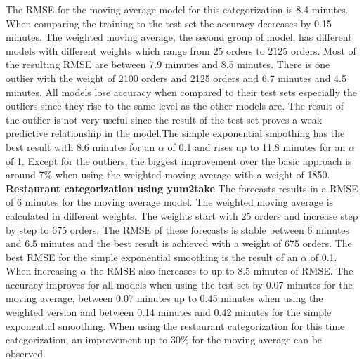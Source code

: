 The RMSE for the moving average model for this categorization is 8.4 minutes. When comparing the training to the test set the accuracy decreases by 0.15 minutes. The weighted moving average, the second group of model, has different models with different weights which range from 25 orders to 2125 orders. Most of the resulting RMSE are between 7.9 minutes and 8.5 minutes. There is one outlier with the weight of 2100 orders and 2125 orders and 6.7 minutes and 4.5 minutes. All models lose accuracy when compared to their test sets especially the outliers since they rise to the same level as the other models are. The result of the outlier is not very useful since the result of the test set proves a weak predictive relationship in the model.\newline The simple exponential smoothing has the best result with 8.6 minutes for an $\alpha$ of 0.1 and rises up to 11.8 minutes for an $\alpha$ of 1.
Except for the outliers, the biggest improvement over the basic approach is around 7\% when using the weighted moving average with a weight of 1850.
\newline\newline\textbf{Restaurant categorization using yum2take}\newline
The forecasts results in a RMSE of 6 minutes for the moving average model. The weighted moving average is calculated in different weights. The weights start with 25 orders and increase step by step to 675 orders. The RMSE of these forecasts is stable between 6 minutes and 6.5 minutes and the best result is achieved with a weight of 675 orders. The best RMSE for the simple exponential smoothing is the result of an $\alpha$ of 0.1. When increasing $\alpha$ the RMSE also increases to up to 8.5 minutes of RMSE. The accuracy improves for all models when using the test set by 0.07 minutes for the moving average, between 0.07 minutes up to 0.45 minutes when using the weighted version and between 0.14 minutes and 0.42 minutes for the simple exponential smoothing.\newline
When using the restaurant categorization for this time categorization, an improvement up to 30\% for the moving average can be observed.
